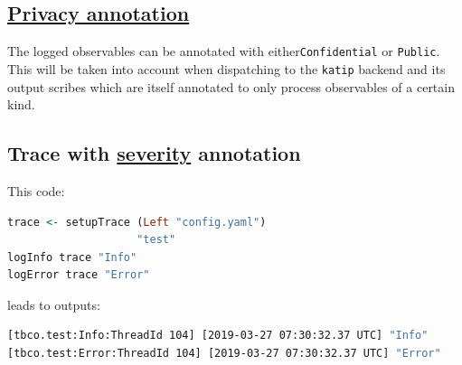 \begin{mdframed}
    \section*{\href{https://github.com/The-Blockchain-Company/tbco-monitoring-framework/blob/master/tbco-monitoring/src/Bcc/BM/Data/LogItem.lhs}{Privacy annotation}}

    The logged observables can be annotated with either\newline \texttt{Confidential} or \texttt{Public}. This will be taken into account when dispatching to the \texttt{katip} backend and its output scribes which are itself annotated to only process observables of a certain kind.
\end{mdframed}

\begin{mdframed}
    \section*{Trace with \href{https://github.com/The-Blockchain-Company/tbco-monitoring-framework/blob/master/tbco-monitoring/src/Bcc/BM/Data/Severity.lhs}{severity} annotation}

This code:

    \begin{lstlisting}[language=Haskell]
trace <- setupTrace (Left "config.yaml")
                    "test"
logInfo trace "Info"
logError trace "Error"
    \end{lstlisting}

leads to outputs:

    \begin{lstlisting}[language=Bash]
[tbco.test:Info:ThreadId 104] [2019-03-27 07:30:32.37 UTC] "Info"
[tbco.test:Error:ThreadId 104] [2019-03-27 07:30:32.37 UTC] "Error"
    \end{lstlisting}
\end{mdframed}

